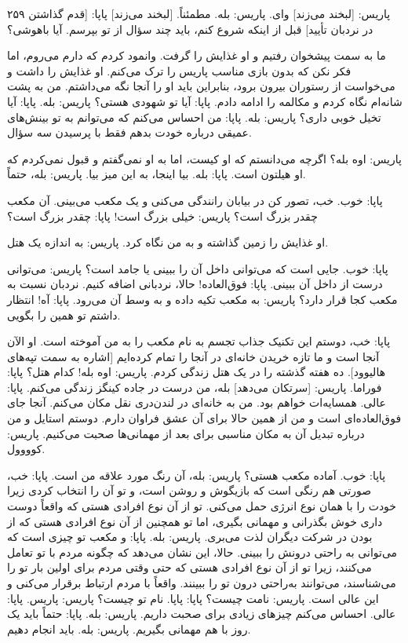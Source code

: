 ۲۵۹  
پاریس: [لبخند می‌زند] وای. پاریس: بله. مطمئناً. [لبخند می‌زند]  
پاپا: [قدم گذاشتن در نردبان تأیید] قبل از اینکه شروع کنم، باید چند  
سؤال از تو بپرسم. آیا باهوشی؟  

ما به سمت پیشخوان رفتیم و او غذایش را گرفت. وانمود کردم که دارم  
می‌روم، اما فکر نکن که بدون بازی مناسب پاریس را ترک می‌کنم.  
او غذایش را داشت و می‌خواست از رستوران بیرون برود، بنابراین باید او را  
آنجا نگه می‌داشتم. من به پشت شانه‌ام نگاه کردم و مکالمه را ادامه دادم.  
پاپا: آیا تو شهودی هستی؟  
پاریس: بله.  
پاپا: آیا تخیل خوبی داری؟  
پاریس: بله.  
پاپا: من احساس می‌کنم که می‌توانم به تو بینش‌های عمیقی درباره خودت  
بدهم فقط با پرسیدن سه سؤال.  

پاریس: اوه بله؟ اگرچه می‌دانستم که او کیست، اما به او نمی‌گفتم و قبول نمی‌کردم که  
او هیلتون است.  
پاپا: بله. بیا اینجا، به این میز بیا.  
پاریس: بله، حتماً.  

پاپا: خوب. خب، تصور کن در بیابان رانندگی می‌کنی و یک مکعب می‌بینی.  
آن مکعب چقدر بزرگ است؟  
پاریس: خیلی بزرگ است!  
پاپا: چقدر بزرگ است؟  

او غذایش را زمین گذاشته و به من نگاه کرد.  
پاریس: به اندازه یک هتل.  

پاپا: خوب. جایی است که می‌توانی داخل آن را ببینی یا جامد است؟  
پاریس: می‌توانی درست از داخل آن ببینی.  
پاپا: فوق‌العاده! حالا، نردبانی اضافه کنیم. نردبان نسبت به مکعب کجا قرار دارد؟  
پاریس: به مکعب تکیه داده و به وسط آن می‌رود.  
پاپا: آه! انتظار داشتم تو همین را بگویی.  

پاپا: خب، دوستم این تکنیک جذاب تجسم به نام مکعب را به من آموخته است.  
او الآن آنجا است و ما تازه خریدن خانه‌ای در آنجا را تمام کرده‌ایم  
[اشاره به سمت تپه‌های هالیوود]. ده هفته گذشته را در یک هتل  
زندگی کردم.  
پاریس: اوه بله! کدام هتل؟  
پاپا: فوراما.  
پاریس: [سرتکان می‌دهد] بله، من درست در جاده کینگز زندگی می‌کنم.  
پاپا: عالی. همسایه‌ات خواهم بود. من به خانه‌ای در لندن‌دری  
نقل مکان می‌کنم. آنجا جای فوق‌العاده‌ای است و من از همین حالا  
برای آن عشق فراوان دارم. دوستم استایل و من درباره تبدیل آن  
به مکان مناسبی برای بعد از مهمانی‌ها صحبت می‌کنیم.  
پاریس: کوووول.  

پاپا: خوب. آماده مکعب هستی؟  
پاریس: بله، آن رنگ مورد علاقه من است.  
پاپا: خب، صورتی هم رنگی است که بازیگوش و روشن است، و تو آن را  
انتخاب کردی زیرا خودت را با همان نوع انرژی حمل می‌کنی.  
تو از آن نوع افرادی هستی که واقعاً دوست داری خوش بگذرانی و مهمانی  
بگیری، اما تو همچنین از آن نوع افرادی هستی که از بودن در شرکت  
دیگران لذت می‌بری.  
پاریس: بله.  
پاپا: و مکعب تو چیزی است که می‌توانی به راحتی درونش را ببینی. حالا، این  
نشان می‌دهد که چگونه مردم با تو تعامل می‌کنند، زیرا تو از آن  
نوع افرادی هستی که حتی وقتی مردم برای اولین بار تو را می‌شناسند،  
می‌توانند به‌راحتی درون تو را ببینند. واقعاً با مردم ارتباط برقرار  
می‌کنی و این عالی است.  
پاریس: نامت چیست؟  
پاپا: پاپا. نام تو چیست؟  
پاریس: پاریس.  
پاپا: عالی. احساس می‌کنم چیزهای زیادی برای صحبت داریم.  
پاریس: بله.  
پاپا: حتماً باید یک روز با هم مهمانی بگیریم.  
پاریس: بله. باید انجام دهیم.  

